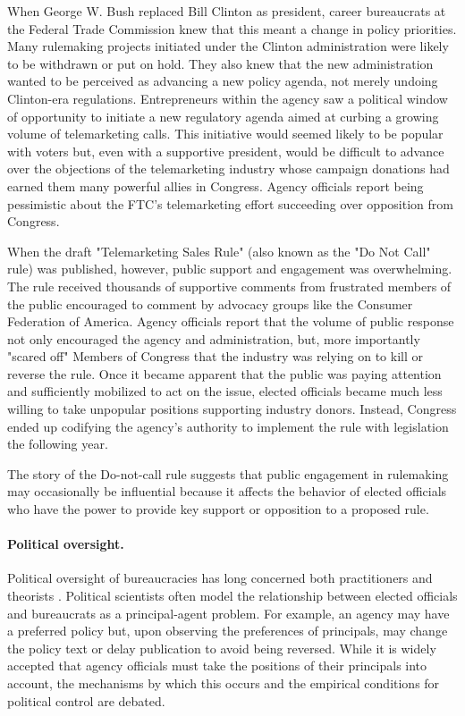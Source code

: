 When George W. Bush replaced Bill Clinton as president, career bureaucrats at the Federal Trade Commission knew that this meant a change in policy priorities. Many rulemaking projects initiated under the Clinton administration were likely to be withdrawn or put on hold. They also knew that the new administration wanted to be perceived as advancing a new policy agenda, not merely undoing Clinton-era regulations. Entrepreneurs within the agency saw a political window of opportunity to initiate a new regulatory agenda aimed at curbing a growing volume of telemarketing calls. This initiative would seemed likely to be popular with voters but, even with a supportive president, would be difficult to advance over the objections of the telemarketing industry whose campaign donations had earned them many powerful allies in Congress. Agency officials report being pessimistic about the FTC's telemarketing effort succeeding over opposition from Congress.

When the draft "Telemarketing Sales Rule" (also known as the "Do Not Call" rule) was published, however, public support and engagement was overwhelming. The rule received thousands of supportive comments from frustrated members of the public encouraged to comment by advocacy groups like the Consumer Federation of America. Agency officials report that the volume of public response not only encouraged the agency and administration, but, more importantly "scared off" Members of Congress that the industry was relying on to kill or reverse the rule. Once it became apparent that the public was paying attention and sufficiently mobilized to act on the issue, elected officials became much less willing to take unpopular positions supporting industry donors. Instead, Congress ended up codifying the agency's authority to implement the rule with legislation the following year.

The story of the Do-not-call rule suggests that public engagement in rulemaking may occasionally be influential because it affects the behavior of elected officials who have the power to provide key support or opposition to a proposed rule.


\paragraph{Political oversight.}
Political oversight of bureaucracies has long concerned both practitioners and theorists \citep{Wilson1989}. Political scientists often model the relationship between elected officials and bureaucrats as a principal-agent problem. For example, an agency may have a preferred policy but, upon observing the preferences of principals, may change the policy text or delay publication to avoid being reversed. While it is widely accepted that agency officials must take the positions of their principals into account, the mechanisms by which this occurs and the empirical conditions for political control are debated.

